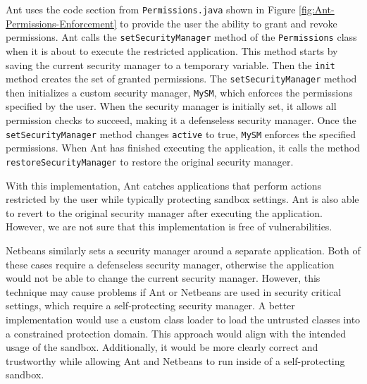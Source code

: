 \documentclass{sig-alternate}
\begin{document}
Ant uses the code section from \texttt{Permissions.java} shown in
Figure \ref{fig:Ant-Permissions-Enforcement} to provide the user
the ability to grant and revoke permissions. Ant calls the \texttt{setSecurityManager}
method of the \texttt{Permissions} class when it is about to execute
the restricted application. This method starts by saving the current
security manager to a temporary variable. Then the \texttt{init} method
creates the set of granted permissions. The \texttt{setSecurityManager}
method then initializes a custom security manager, \texttt{MySM},
which enforces the permissions specified by the user. When the security
manager is initially set, it allows all permission checks to succeed,
making it a defenseless security manager. Once the \texttt{setSecurityManager}
method changes \texttt{active} to true, \texttt{MySM} enforces the
specified permissions. When Ant has finished executing the application,
it calls the method \texttt{restoreSecurityManager} to restore the
original security manager.

With this implementation, Ant catches applications that perform actions
restricted by the user while typically protecting sandbox settings.
Ant is also able to revert to the original security manager after
executing the application. However, we are not sure that this implementation
is free of vulnerabilities.

Netbeans similarly sets a security manager around a separate application.
Both of these cases require a defenseless security manager, otherwise
the application would not be able to change the current security manager.
However, this technique may cause problems if Ant or Netbeans are
used in security critical settings, which require a self-protecting
security manager. A better implementation would use a custom class
loader to load the untrusted classes into a constrained protection
domain. This approach would align with the intended usage of the sandbox.
Additionally, it would be more clearly correct and trustworthy while
allowing Ant and Netbeans to run inside of a self-protecting sandbox.
\end{document}

